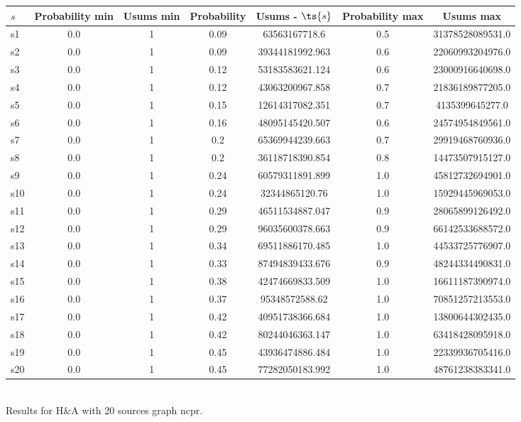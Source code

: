 \documentclass{article}
\begin{document}
\noindent\begin{tabular}{|l|c|c|c|c|c|c|}
\hline
$s$& Probability min & Usums min & Probability & Usums - $\ts{s}$ & Probability max & Usums max\\
\hline
s1 &0.0 & 1 & 0.09 & 63563167718.6 & 0.5 & 31378528089531.0\\
\hline
s2 &0.0 & 1 & 0.09 & 39344181992.963 & 0.6 & 22060993204976.0\\
\hline
s3 &0.0 & 1 & 0.12 & 53183583621.124 & 0.6 & 23000916640698.0\\
\hline
s4 &0.0 & 1 & 0.12 & 43063200967.858 & 0.7 & 21836189877205.0\\
\hline
s5 &0.0 & 1 & 0.15 & 12614317082.351 & 0.7 & 4135399645277.0\\
\hline
s6 &0.0 & 1 & 0.16 & 48095145420.507 & 0.6 & 24574954849561.0\\
\hline
s7 &0.0 & 1 & 0.2 & 65369944239.663 & 0.7 & 29919468760936.0\\
\hline
s8 &0.0 & 1 & 0.2 & 36118718390.854 & 0.8 & 14473507915127.0\\
\hline
s9 &0.0 & 1 & 0.24 & 60579311891.899 & 1.0 & 45812732694901.0\\
\hline
s10 &0.0 & 1 & 0.24 & 32344865120.76 & 1.0 & 15929445969053.0\\
\hline
s11 &0.0 & 1 & 0.29 & 46511534887.047 & 0.9 & 28065899126492.0\\
\hline
s12 &0.0 & 1 & 0.29 & 96035600378.663 & 0.9 & 66142533688572.0\\
\hline
s13 &0.0 & 1 & 0.34 & 69511886170.485 & 1.0 & 44533725776907.0\\
\hline
s14 &0.0 & 1 & 0.33 & 87494839433.676 & 0.9 & 48244334490831.0\\
\hline
s15 &0.0 & 1 & 0.38 & 42474669833.509 & 1.0 & 16611187390974.0\\
\hline
s16 &0.0 & 1 & 0.37 & 95348572588.62 & 1.0 & 70851257213553.0\\
\hline
s17 &0.0 & 1 & 0.42 & 40951738366.684 & 1.0 & 13800644302435.0\\
\hline
s18 &0.0 & 1 & 0.42 & 80244046363.147 & 1.0 & 63418428095918.0\\
\hline
s19 &0.0 & 1 & 0.45 & 43936474886.484 & 1.0 & 22339936705416.0\\
\hline
s20 &0.0 & 1 & 0.45 & 77282050183.992 & 1.0 & 48761238383341.0\\
\hline
\end{tabular}\\

\noindent Results for H\&A with 20 sources graph ncpr.
\end{document}
